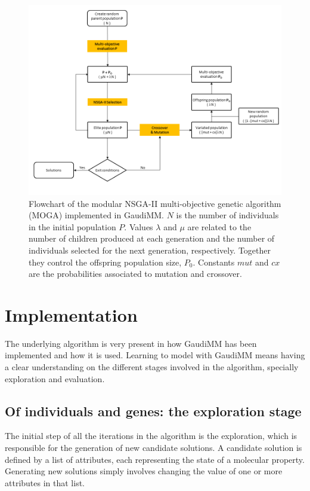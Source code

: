 \begin{figure} %
	\vspace*{-1cm}
	\includegraphics[width=0.9\textheight,angle=90]{./figures/04/nsga.png}
	\cprotect\caption[NSGA-II algorithm]{Flowchart of the modular NSGA-II multi-objective genetic algorithm (MOGA) implemented in GaudiMM. $ N $ is the number of individuals in the initial population $P$. Values $\lambda$ and $\mu$ are related to the number of children produced at each generation and the number of individuals selected for the next generation, respectively. Together they control the offspring population size, $ P_{0} $. Constants $ mut $ and $ cx $ are the probabilities associated to mutation and crossover.}
	\label{fig:nsga}
\end{figure}


\section{Implementation}

The underlying algorithm is very present in how GaudiMM has been implemented and how it is used. Learning to model with GaudiMM means having a clear understanding on the different stages involved in the algorithm, specially exploration and evaluation.

\subsection{Of individuals and genes: the exploration stage}
The initial step of all the iterations in the algorithm is the exploration, which is responsible for the generation of new candidate solutions. A candidate solution is defined by a list of attributes, each representing the state of a molecular property. Generating new solutions simply involves changing the value of one or more attributes in that list.

